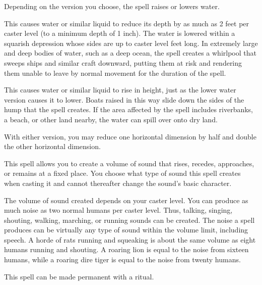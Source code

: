 \spelldur{\durmed \dismissable}
\begin{spelleffect}
    Depending on the version you choose, the  spell raises or lowers water.
    \par {} This causes water or similar liquid to reduce its depth by as much as 2 feet per caster level (to a minimum depth of 1 inch). The water is lowered within a squarish depression whose sides are up to caster level  feet long. In extremely large and deep bodies of water, such as a deep ocean, the spell creates a whirlpool that sweeps ships and similar craft downward, putting them at risk and rendering them unable to leave by normal movement for the duration of the spell.
    \par {} This causes water or similar liquid to rise in height, just as the lower water version causes it to lower. Boats raised in this way slide down the sides of the hump that the spell creates. If the area affected by the spell includes riverbanks, a beach, or other land nearby, the water can spill over onto dry land.
\end{spelleffect}
\begin{spellnotes}
    With either version, you may reduce one horizontal dimension by half and double the other horizontal dimension.
\end{spellnotes}

\spellrng{\rngclose}
\spelldur{\durshort \dismissable}
\begin{spelleffect}
    This spell allows you to create a volume of sound that rises, recedes, approaches, or remains at a fixed place. You choose what type of sound this spell creates when casting it and cannot thereafter change the sound's basic character.
    \par The volume of sound created depends on your caster level. You can produce as much noise as two normal humans per caster level. Thus, talking, singing, shouting, walking, marching, or running sounds can be created. The noise a  spell produces can be virtually any type of sound within the volume limit, including speech. A horde of rats running and squeaking is about the same volume as eight humans running and shouting. A roaring lion is equal to the noise from sixteen humans, while a roaring dire tiger is equal to the noise from twenty humans.
\end{spelleffect}
\begin{spellnotes}
    This spell can be made permanent with a  ritual.
\end{spellnotes}

